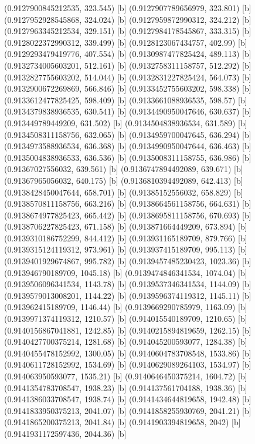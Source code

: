 {{{(0.9127900845212535, 323.545) [b] 
(0.9127907789656979, 323.801) [b] 
(0.9127952928545868, 324.024) [b] 
(0.9127959872990312, 324.212) [b] 
(0.9127963345212534, 329.151) [b] 
(0.9127984178545867, 333.315) [b] 
(0.9128022372990312, 339.499) [b] 
(0.9128123067434757, 402.99) [b] 
(0.9129293479419776, 407.554) [b] 
(0.9130987477825424, 489.113) [b] 
(0.9132734005603201, 512.161) [b] 
(0.9132758311158757, 512.292) [b] 
(0.9132827755603202, 514.044) [b] 
(0.9132831227825424, 564.073) [b] 
(0.9132900672269869, 566.846) [b] 
(0.9133452755603202, 598.338) [b] 
(0.9133612477825425, 598.409) [b] 
(0.9133661088936535, 598.57) [b] 
(0.9134379838936535, 630.541) [b] 
(0.9134490950047646, 630.637) [b] 
(0.913449789449209, 631.502) [b] 
(0.9134504838936534, 631.589) [b] 
(0.9134508311158756, 632.065) [b] 
(0.9134959700047645, 636.294) [b] 
(0.9134973588936534, 636.368) [b] 
(0.9134990950047644, 636.463) [b] 
(0.9135004838936533, 636.536) [b] 
(0.9135008311158755, 636.986) [b] 
(0.91367027556032, 639.561) [b] 
(0.9136747894492089, 639.671) [b] 
(0.91367965056032, 640.175) [b] 
(0.9136810394492089, 642.413) [b] 
(0.9138428450047644, 658.701) [b] 
(0.91385152556032, 658.829) [b] 
(0.9138570811158756, 663.216) [b] 
(0.9138664561158756, 664.631) [b] 
(0.9138674977825423, 665.442) [b] 
(0.9138695811158756, 670.693) [b] 
(0.9138706227825423, 671.158) [b] 
(0.913871664449209, 673.894) [b] 
(0.9139310186752299, 844.412) [b] 
(0.913931165189709, 879.766) [b] 
(0.9139315124119312, 973.961) [b] 
(0.913937415189709, 995.113) [b] 
(0.9139401929674867, 995.782) [b] 
(0.9139457485230423, 1023.36) [b] 
(0.913946790189709, 1045.18) [b] 
(0.9139474846341534, 1074.04) [b] 
(0.9139506096341534, 1143.78) [b] 
(0.9139537346341534, 1144.09) [b] 
(0.9139579013008201, 1144.22) [b] 
(0.9139596374119312, 1145.11) [b] 
(0.913962415189709, 1146.44) [b] 
(0.9139669290785979, 1163.09) [b] 
(0.9139971374119312, 1210.57) [b] 
(0.914015540189709, 1210.65) [b] 
(0.9140156867041881, 1242.85) [b] 
(0.9140215894819659, 1262.15) [b] 
(0.9140427700375214, 1281.68) [b] 
(0.914045200593077, 1284.38) [b] 
(0.9140455478152992, 1300.05) [b] 
(0.9140604783708548, 1533.86) [b] 
(0.9140611728152992, 1534.69) [b] 
(0.9140629089264103, 1534.97) [b] 
(0.914063950593077, 1535.21) [b] 
(0.9140646450375214, 1604.72) [b] 
(0.9141354783708547, 1938.23) [b] 
(0.914137561704188, 1938.36) [b] 
(0.9141386033708547, 1938.74) [b] 
(0.9141434644819658, 1942.48) [b] 
(0.9141833950375213, 2041.07) [b] 
(0.9141858255930769, 2041.21) [b] 
(0.9141865200375213, 2041.84) [b] 
(0.9141903394819658, 2042) [b] 
(0.9141931172597436, 2044.36) [b] 
}}}
